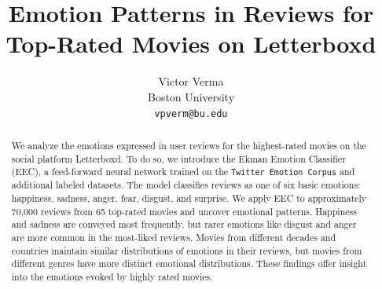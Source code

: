 \documentclass[11pt]{article}
\title{Emotion Patterns in Reviews for Top-Rated Movies on Letterboxd}
\author{Victor Verma \\
Boston University \\
\texttt{vpverm@bu.edu}}
\begin{document}
\maketitle
\begin{abstract}
We analyze the emotions expressed in user reviews for the highest-rated movies on the social platform Letterboxd. To do so, we introduce the Ekman Emotion Classifier (EEC), a feed-forward neural network trained on the \texttt{Twitter Emotion Corpus} and additional labeled datasets. The model classifies reviews as one of six basic emotions: happiness, sadness, anger, fear, disgust, and surprise. We apply EEC to approximately 70,000 reviews from 65 top-rated movies and uncover emotional patterns. Happiness and sadness are conveyed most frequently, but rarer emotions like disgust and anger are more common in the most-liked reviews. Movies from different decades and countries maintain similar distributions of emotions in their reviews, but movies from different genres have more distinct emotional distributions. These findings offer insight into the emotions evoked by highly rated movies.
\end{abstract}
\end{document}
